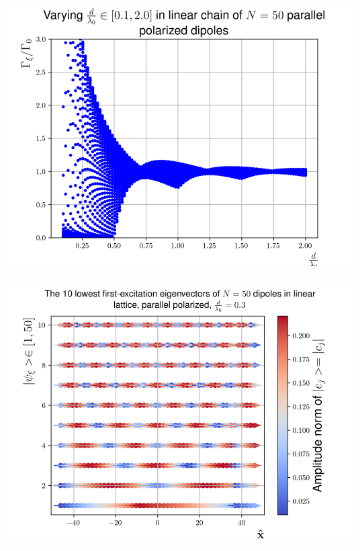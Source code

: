 \documentclass{article}
\begin{document}
\begin{figure}[H]
    \centering
    \begin{subfigure}[b]{0.49\textwidth}
        \includegraphics[width=\textwidth]{figs/case_linear_parallel_var_distance_01_2.png}
        \caption{}
        \label{fig:linear_chain_decayrates_distance_N50}
    \end{subfigure}
    \hfill
    \begin{subfigure}[b]{0.49\textwidth}
        \includegraphics[width=\textwidth]{figs/dipoles_case_linear_parallel_10loweststates.png}
        \caption{}
        \label{fig:linear_chain_10loweststates}
    \end{subfigure}


\end{figure}
\end{document}
